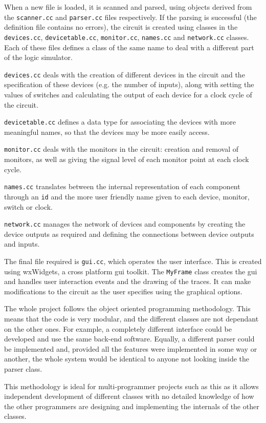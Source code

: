 \documentclass[a4paper,10pt]{article}  %
\begin{document}
When a new file is loaded, it is scanned and parsed, using objects
derived from the \texttt{scanner.cc} and \texttt{parser.cc} files
respectively. If the parsing is successful (the definition file
contains no errors), the circuit is created using classes in the
\texttt{devices.cc}, \texttt{devicetable.cc}, \texttt{monitor.cc},
\texttt{names.cc} and \texttt{network.cc} classes. Each of these files
defines a class of the same name to deal with a different part of the logic
simulator.

\texttt{devices.cc} deals with the creation of different
devices in the circuit and the specification of these devices
(e.g. the number of inputs), along with setting the values of switches
and calculating the output of each device for a clock cycle of the circuit.

\texttt{devicetable.cc} defines a data type for associating the
devices with more meaningful names, so that the devices may be more
easily access.

\texttt{monitor.cc} deals with the monitors in the circuit: creation
and removal of monitors, as well as giving the signal level of each
monitor point at each clock cycle.

\texttt{names.cc} translates between the internal representation of
each component through an \texttt{id} and the more user friendly name
given to each device, monitor, switch or clock.

\texttt{network.cc} manages the network of devices and components by
creating the device outputs as required and defining the connections
between device outputs and inputs.

The final file required is \texttt{gui.cc}, which operates the user
interface. This is created using wxWidgets, a cross platform gui
toolkit. The \texttt{MyFrame} class creates the gui and handles user
interaction events and the drawing of the traces. It can make
modifications to the circuit as the user specifies using the graphical
options.

The whole project follows the object oriented programming
methodology. This means that the code is very modular, and the
different classes are not dependant on the other ones. For example, a
completely different interface could be developed and use the same
back-end software. Equally, a different parser could be implemented
and, provided all the features were implemented in some way or
another, the whole system would be identical to anyone not looking
inside the parser class.

This methodology is ideal for multi-programmer projects such as this
as it allows independent development of different classes with no
detailed knowledge of how the other programmers are designing and
implementing the internals of the other classes.
\end{document}
